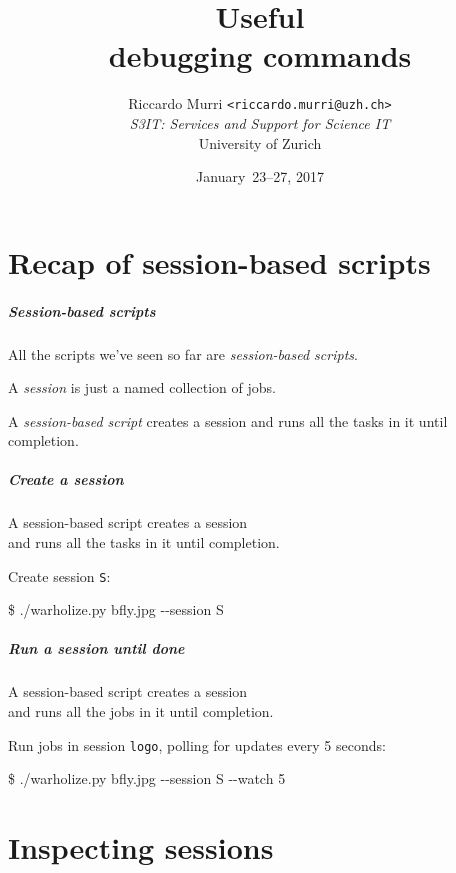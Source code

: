 \documentclass[english,serif,mathserif,xcolor=pdftex,dvipsnames,table]{beamer}
\title[Debugging commands]{%
  Useful \\ debugging commands
}
\author[R. Murri, S3IT UZH]{%
  Riccardo Murri \texttt{<riccardo.murri@uzh.ch>}
  \\[1ex]
  \emph{S3IT: Services and Support for Science IT}
  \\[1ex]
  University of Zurich
}
\date{January~23--27, 2017}
\begin{document}
\maketitle


\part{Recap of session-based scripts}


\begin{frame}
  \frametitle{Session-based scripts}

  All the scripts we've seen so far are \emph{session-based scripts}.

  \+ A \emph{session} is just a named collection of jobs.

  \+ A \emph{session-based script} creates a session and runs all the
  tasks in it until completion.
\end{frame}


\begin{frame}
  \frametitle{Create a session}

  A session-based script \alert{creates a session}
  \\
  and runs all the tasks in it until completion.

  \+ Create session \texttt{S}:
\begin{semiverbatim}
    \$ ./warholize.py bfly.jpg -{}-session S
\end{semiverbatim}
\end{frame}


\begin{frame}[fragile]
  \frametitle{Run a session until done}

  A session-based script creates a session
  \\
  and \alert<1>{runs all the jobs in it until completion.}

  \+ Run jobs in session \texttt{logo},
  polling for updates every 5 seconds:
\begin{semiverbatim}\small
    \$ ./warholize.py bfly.jpg -{}-session S -{}-watch 5
\end{semiverbatim}

  \+ 
\end{frame}


\part{Inspecting sessions}
\end{document}
